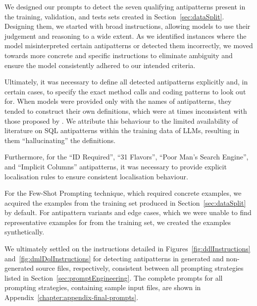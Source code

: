 We designed our prompts to detect the seven qualifying antipatterns present in the training, validation, and tests sets created in Section~\ref{sec:dataSplit}. Designing them, we started with broad instructions, allowing models to use their judgement and reasoning to a wide extent. As we identified instances where the model misinterpreted certain antipatterns or detected them incorrectly, we moved towards more concrete and specific instructions to eliminate ambiguity and ensure the model consistently adhered to our intended criteria.

Ultimately, it was necessary to define all detected antipatterns explicitly and, in certain cases, to specify the exact method calls and coding patterns to look out for. When models were provided only with the names of antipatterns, they tended to construct their own definitions, which were at times inconsistent with those proposed by . We attribute this behaviour to the limited availability of literature on SQL antipatterns within the training data of LLMs, resulting in them “hallucinating” the definitions. 

Furthermore, for the “ID Required”, “31 Flavors”, “Poor Man's Search Engine”, and “Implicit Columns” antipatterns, it was necessary to provide explicit localisation rules to ensure consistent localisation behaviour.

For the Few-Shot Prompting technique, which required concrete examples, we acquired the examples from the training set produced in Section~\ref{sec:dataSplit} by default. For antipattern variants and edge cases, which we were unable to find representative examples for from the training set, we created the examples synthetically.

We ultimately settled on the instructions detailed in Figures~\ref{fig:ddlInstructions} and~\ref{fig:dmlDqlInstructions} for detecting antipatterns in generated and non-generated source files, respectively, consistent between all prompting strategies listed in Section~\ref{sec:promptEngineering}. The complete prompts for all prompting strategies, containing sample input files, are shown in Appendix~\ref{chapter:appendix-final-prompts}.

